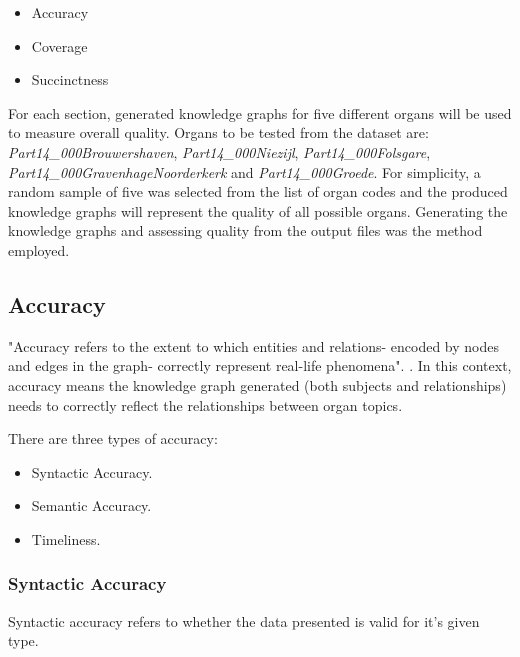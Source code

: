 \vspace{-0.2cm}
\begin{itemize}
    \itemsep0em 
    \item Accuracy
    \vspace{-0.15cm}
    \item Coverage
    \vspace{-0.15cm}
    \item Succinctness
\end{itemize}
\vspace{-0.1cm}

For each section, generated knowledge graphs for five different organs will be used to measure overall quality. Organs to be tested from the dataset are: \textit{Part14\_000Brouwershaven}, \textit{Part14\_000Niezijl}, \textit{Part14\_000Folsgare}, \textit{Part14\_000GravenhageNoorderkerk} and \textit{Part14\_000Groede}. For simplicity, a random sample of five was selected from the list of organ codes and the produced knowledge graphs will represent the quality of all possible organs. Generating the knowledge graphs and assessing quality from the output files was the method employed. 

\subsection{Accuracy}
\hspace{0.5cm} "Accuracy refers to the extent to which entities and relations- encoded by nodes and edges in the graph- correctly represent real-life phenomena". \cite{knowledgegraphevaulationbook}. In this context, accuracy means the knowledge graph generated (both subjects and relationships) needs to correctly reflect the relationships between organ topics. 

There are three types of accuracy: 

\vspace{-0.2cm}
\begin{itemize}
    \itemsep0em 
\item Syntactic Accuracy.
\vspace{-0.1cm}
\item Semantic Accuracy.
\vspace{-0.1cm}
\item Timeliness.
\end{itemize}
\vspace{-0.4cm}

\subsubsection{Syntactic Accuracy}
\hspace{0.5cm} Syntactic accuracy refers to whether the data presented is valid for it's given type. \cite{knowledgegraphevaulationbook}

